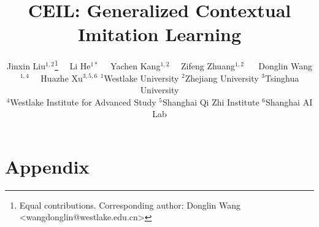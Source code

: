 \documentclass{article}
\title{CEIL: Generalized Contextual Imitation Learning}
\author{Jinxin Liu$^{1,2}$\thanks{Equal contributions. Corresponding author: Donglin Wang <wangdonglin@westlake.edu.cn>} 
\: \ \ 
Li He$^{1 *}$ \: \ \ 
Yachen Kang$^{1,2}$ \: \ \ 
Zifeng Zhuang$^{1,2}$ \: \ \ 
\AND 
Donglin Wang$^{1,4}$ \: \ \ 
Huazhe Xu$^{3,5,6}$
\AND 
\normalfont 
$^{1}$Westlake University \: 
$^{2}$Zhejiang University \: 
$^{3}$Tsinghua University \: \\
$^{4}$Westlake Institute for Advanced Study \: 
$^{5}$Shanghai Qi Zhi Institute  \: 
$^{6}$Shanghai AI Lab
}
\begin{document}
	
	
\maketitle
	
	


























\newpage 

\section*{Appendix}


\end{document}
